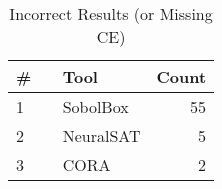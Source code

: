 
\begin{table}[h]
\begin{center}
\caption{Incorrect Results (or Missing CE)} \label{tab:stats4}
{\setlength{\tabcolsep}{2pt}
\begin{tabular}[h]{@{}llr@{}}
\toprule
\textbf{\# ~} & \textbf{Tool} & \textbf{Count}\\
\midrule
1 & SobolBox & 55 \\
2 & NeuralSAT & 5 \\
3 & CORA & 2 \\
\bottomrule
\end{tabular}
}
\end{center}
\end{table}


